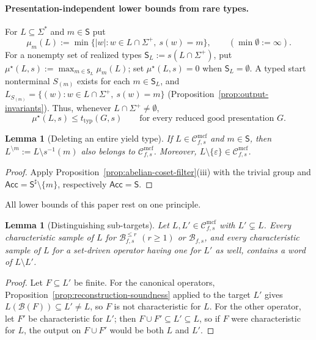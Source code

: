 \documentclass[11pt]{article}
\numberwithin{equation}{section}
\theoremstyle{plain}
\newtheorem{lemma}[theorem]{Lemma}
\theoremstyle{definition}
\theoremstyle{remark}
\newcommand{\Cmcf}[2]{\mathcal{C}^{\mathrm{mcf}}_{#1,#2}}
\newcommand{\eps}{\varepsilon}
\theoremstyle{plain}
\begin{document}
\paragraph{Presentation-independent lower bounds from rare types.}
For $L\subseteq\Sigma^*$ and $m\in\mathsf S$ put
\[
 \mu_m(L):=\min\{|w|:w\in L\cap\Sigma^+,\ s(w)=m\},
 \qquad (\min\emptyset:=\infty).
\]
For a nonempty set of realized types $\mathsf S_L:=s(L\cap\Sigma^+)$, put
$\mu^\star(L,s):=\max_{m\in \mathsf S_L}\mu_m(L)$; set
$\mu^\star(L,s)=0$ when $\mathsf S_L=\emptyset$.  A typed start nonterminal
$S_{(m)}$ exists for each $m\in \mathsf S_L$, and
$L_{S_{(m)}}=\{(w):w\in L\cap\Sigma^+,\ s(w)=m\}$
(Proposition~\ref{prop:output-invariants}). Thus, whenever
$L\cap\Sigma^+\ne\emptyset$,
\begin{equation}\label{eq:root-thickness}
 \mu^\star(L,s)\le t_{\mathrm{typ}}(G,s)
 \qquad\text{for every reduced good presentation }G.
\end{equation}

\begin{lemma}[Deleting an entire yield type]
\label{lem:type-deletion}
If $L\in\Cmcf{f}{s}$ and $m\in\mathsf S$, then
$L^{\setminus m}:=L\setminus s^{-1}(m)$ also belongs to
$\Cmcf{f}{s}$. Moreover, $L\setminus\{\eps\}\in\Cmcf{f}{s}$.
\end{lemma}

\begin{proof}
Apply Proposition~\ref{prop:abelian-coset-filter}(iii) with the trivial group and
$\mathsf{Acc}=\mathsf S^\sharp\setminus\{m\}$, respectively $\mathsf{Acc}=\mathsf S$.
\end{proof}

All lower bounds of this paper rest on one principle.

\begin{lemma}[Distinguishing sub-targets]
\label{lem:distinguishing}
Let $L,L'\in\Cmcf{f}{s}$ with $L'\subsetneq L$.  Every characteristic sample of
$L$ for $\mathcal B^{\le r}_{f,s}$ $(r\ge1)$ or $\mathcal B_{f,s}$, and every
characteristic sample of $L$ for a set-driven operator having one for $L'$ as
well, contains a word of $L\setminus L'$.
\end{lemma}

\begin{proof}
Let $F\subseteq L'$ be finite.  For the canonical operators,
Proposition~\ref{prop:reconstruction-soundness} applied to the target $L'$ gives
$L(\mathcal B(F))\subseteq L'\ne L$, so $F$ is not characteristic for $L$.  For the
other operator, let $F'$ be characteristic for $L'$; then
$F\cup F'\subseteq L'\subseteq L$, so if $F$ were characteristic for $L$, the output
on $F\cup F'$ would be both $L$ and $L'$.
\end{proof}
\end{document}

